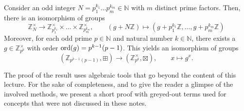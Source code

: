 \documentclass[a4paper, oneside, 12pt]{amsart}
\begin{document}
\begin{lemma}\label{lem:Chinese-remainder}
  Consider an odd integer \(N=p_{1}^{k_{1}} \dots p_{m}^{k_{m}} \in \mathbb{N}\)  with \(m\) distinct prime factors.
  Then, there is an isomorphism of groups
  \begin{equation}
    \mathbb{Z}_{N}^{\times } \to \mathbb{Z}_{p_{1}^{k_{1}}}^{\times} \times \dots \times \mathbb{Z}_{p_{m}^{k_{m}}}^{\times}, \qquad (g + N \mathbb{Z}) \mapsto (g + p_{1}^{k_{1}} \mathbb{Z}, \dots , g + p_{m}^{k_{m}} \mathbb{Z})
  \end{equation}
  Moreover, for each odd prime \(p\in \mathbb{N}\) and natural number \( k \in \mathbb{N}\),
  there exists a \(g \in \mathbb{Z}_{p^{k}}^{\times}\) with order \(\operatorname{ord}(g) =p^{k-1}(p-1)\).
  This yields an isomorphism of groups
  \begin{equation*}
     (\mathbb{Z}_{p^{k-1}(p-1)}, \boxplus) \to (\mathbb{Z}_{p^{k}}^{\times }, \boxtimes), \qquad x \mapsto g^{x}.
  \end{equation*}
\end{lemma}
The proof of the result uses algebraic tools that go beyond the content of this lecture.
For the sake of completeness, and to give the reader a glimpse of the involved methods, we present a short proof with greyed-out terms used for concepts that were not discussed in these notes.
\end{document}
